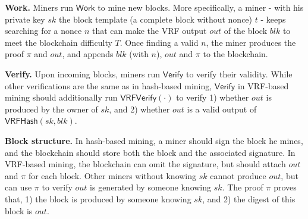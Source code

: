 \textbf{Work.}
Miners run $\mathsf{Work}$ to mine new blocks.
More specifically, a miner - with his private key $sk$ the block template (a complete block without nonce) $t$ - keeps searching for a nonce $n$ that can make the VRF output $out$ of the block $blk$ to meet the blockchain difficulty $T$.
Once finding a valid $n$, the miner produces the proof $\pi$ and $out$, and appends $blk$ (with $n$), $out$ and $\pi$ to the blockchain.

\textbf{Verify.}
Upon incoming blocks, miners run $\mathsf{Verify}$ to verify their validity.
While other verifications are the same as in hash-based mining, $\mathsf{Verify}$ in VRF-based mining should additionally run $\mathsf{VRFVerify}(\cdot)$ to verify 1) whether $out$ is produced by the owner of $sk$, and 2) whether $out$ is a valid output of $\mathsf{VRFHash}(sk, blk)$.

\textbf{Block structure.}
In hash-based mining, a miner should sign the block he mines, and the blockchain should store both the block and the associated signature.
In VRF-based mining, the blockchain can omit the signature, but should attach $out$ and $\pi$ for each block.
Other miners without knowing $sk$ cannot produce $out$, but can use $\pi$ to verify $out$ is generated by someone knowing $sk$.
The proof $\pi$ proves that, 1) the block is produced by someone knowing $sk$, and 2) the digest of this block is $out$.